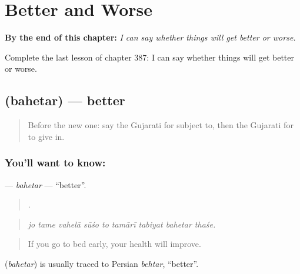 
\chapter{Better and Worse}
\label{ch:gu-better-and-worse}

\begin{chapteropening}
\textbf{By the end of this chapter:} \emph{I can say whether things will get better or worse.}

Complete the last lesson of chapter 387: I can say whether things will get better or worse.
\end{chapteropening}

\section[\texorpdfstring{\gu{બહેતર} (bahetar)}{બહેતર (bahetar)}]{ (bahetar) — better}

\label{lesson:GU-C387-bahetar}



\begin{quote}
Before the new one: say the Gujarati for subject to, then the Gujarati for to give in.
\end{quote}

\subsection*{You'll want to know: }
\textbf{} — \emph{bahetar} — \textquotedblleft{}better\textquotedblright{}.

\begin{quote}
        .
\end{quote}

\begin{quote}
\emph{jo tame vahelā sūśo to tamārī tabiyat bahetar thaśe.}
\end{quote}

\begin{quote}
If you go to bed early, your health will improve.
\end{quote}

\begin{cousinweb}
\textbf{} (\emph{bahetar}) is usually traced to Persian \emph{behtar}, \textquotedblleft{}better\textquotedblright{}.
\end{cousinweb}

